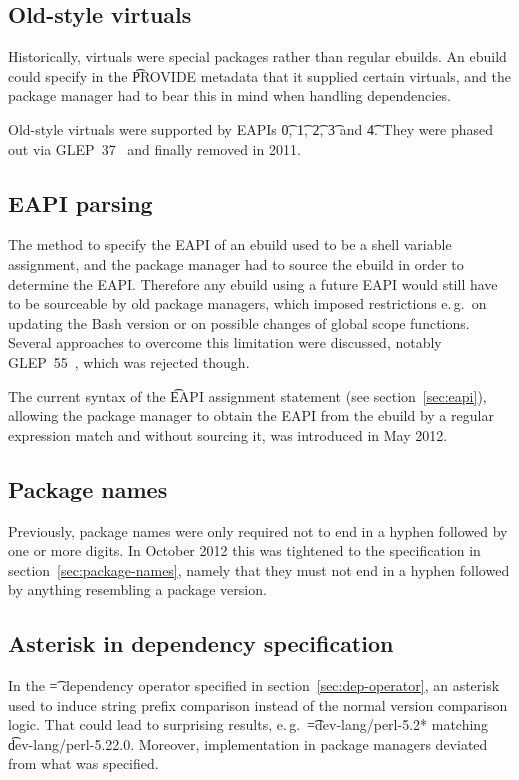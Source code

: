 \subsection{Old-style virtuals}
Historically, virtuals were special packages rather than regular ebuilds. An ebuild could specify in
the \t{PROVIDE} metadata that it supplied certain virtuals, and the package manager had to bear this
in mind when handling dependencies.

Old-style virtuals were supported by EAPIs \t{0}, \t{1}, \t{2}, \t{3} and \t{4}. They were phased
out via GLEP~37~\cite{Glep37} and finally removed in 2011.


\subsection{EAPI parsing}
The method to specify the EAPI of an ebuild used to be a shell variable assignment, and the package
manager had to source the ebuild in order to determine the EAPI\@. Therefore any ebuild using
a future EAPI would still have to be sourceable by old package managers, which imposed restrictions
e.\,g.\ on updating the Bash version or on possible changes of global scope functions. Several
approaches to overcome this limitation were discussed, notably GLEP~55~\cite{Glep55}, which was
rejected though.

The current syntax of the \t{EAPI} assignment statement (see section~\ref{sec:eapi}), allowing
the package manager to obtain the EAPI from the ebuild by a regular expression match and without
sourcing it, was introduced in May 2012.

\subsection{Package names}
Previously, package names were only required not to end in a hyphen followed by one or more digits.
In October 2012 this was tightened to the specification in section~\ref{sec:package-names}, namely
that they must not end in a hyphen followed by anything resembling a package version.

\subsection{Asterisk in dependency specification}
In the \t{=} dependency operator specified in section~\ref{sec:dep-operator}, an asterisk used to
induce string prefix comparison instead of the normal version comparison logic. That could lead to
surprising results, e.\,g.\ \t{=dev-lang/perl-5.2*} matching \t{dev-lang/perl-5.22.0}. Moreover,
implementation in package managers deviated from what was specified.

